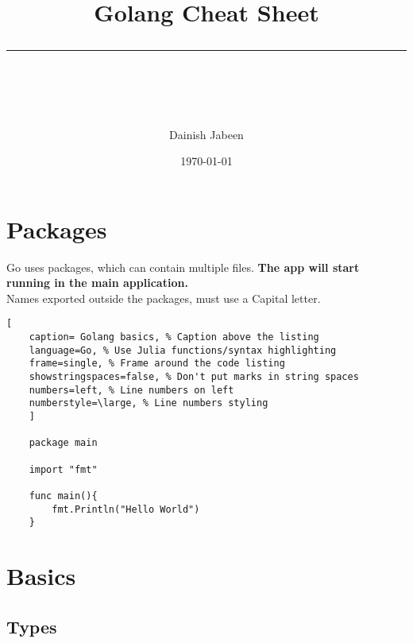 \documentclass[11pt]{scrartcl} %
\title{	
	\normalfont\normalsize
	\vspace{20pt} %
	{\huge Golang Cheat Sheet}\\ %
	\vspace{12pt} %
	\rule{\linewidth}{2pt}\\ %
}
\author{\small Dainish Jabeen} %
\date{\normalsize\today} %
\begin{document}
\maketitle %

\section{Packages}

Go uses packages, which can contain multiple files. \textbf{The app will start running in the main 
application.}\\

Names exported outside the packages, must use a Capital letter.

\begin{lstlisting}[
	caption= Golang basics, % Caption above the listing
	language=Go, % Use Julia functions/syntax highlighting
	frame=single, % Frame around the code listing
	showstringspaces=false, % Don't put marks in string spaces
	numbers=left, % Line numbers on left
	numberstyle=\large, % Line numbers styling
	]

	package main

	import "fmt"

	func main(){
		fmt.Println("Hello World")
	}

\end{lstlisting}

\newpage

\section{Basics}

\subsection{Types}
\end{document}
